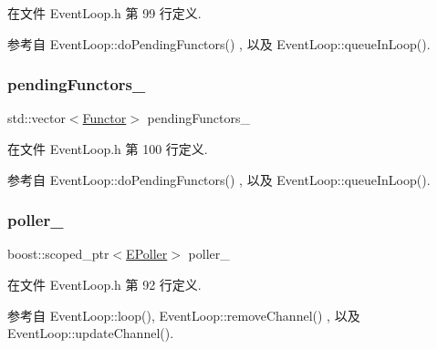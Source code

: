 在文件 Event\+Loop.\+h 第 99 行定义.



参考自 Event\+Loop\+::do\+Pending\+Functors() , 以及 Event\+Loop\+::queue\+In\+Loop().

\mbox{\label{classmuduo_1_1EventLoop_ab8934a9424f158aa4f0346132f24a2d6}} 
\subsubsection{\texorpdfstring{pending\+Functors\+\_\+}{pendingFunctors\_}}
{\footnotesize\ttfamily std\+::vector$<$\hyperlink{classmuduo_1_1EventLoop_aa47556388c5bf0b2534c9816841d8e7a}{Functor}$>$ pending\+Functors\+\_\+\hspace{0.3cm}{\ttfamily [private]}}



在文件 Event\+Loop.\+h 第 100 行定义.



参考自 Event\+Loop\+::do\+Pending\+Functors() , 以及 Event\+Loop\+::queue\+In\+Loop().

\mbox{\label{classmuduo_1_1EventLoop_ac086876e4c7ab85ef83d35afa0340693}} 
\subsubsection{\texorpdfstring{poller\+\_\+}{poller\_}}
{\footnotesize\ttfamily boost\+::scoped\+\_\+ptr$<$\hyperlink{classmuduo_1_1EPoller}{E\+Poller}$>$ poller\+\_\+\hspace{0.3cm}{\ttfamily [private]}}



在文件 Event\+Loop.\+h 第 92 行定义.



参考自 Event\+Loop\+::loop(), Event\+Loop\+::remove\+Channel() , 以及 Event\+Loop\+::update\+Channel().

\mbox{\label{classmuduo_1_1EventLoop_a9331500c7091e0eec7cb1e608897b0ed}} 
